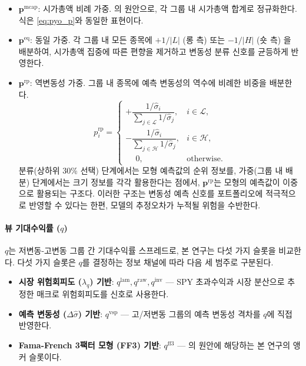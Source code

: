 \documentclass{article}
\begin{document}
\begin{itemize}
  \item $\mathbf{p}^{\mathrm{mcap}}$: 시가총액 비례 가중. \citet{pyo2018}의 원안으로, 각 그룹 내 시가총액 합계로 정규화한다. 식은 \eqref{eq:pyo_p}와 동일한 표현이다.

  \item $\mathbf{p}^{\mathrm{eq}}$: 동일 가중. 각 그룹 내 모든 종목에 $+1/|L|$ (롱 측) 또는 $-1/|H|$ (숏 측) 을 배분하여, 시가총액 집중에 따른 편향을 제거하고 변동성 분류 신호를 균등하게 반영한다.

  \item $\mathbf{p}^{\mathrm{rp}}$: 역변동성 가중. 그룹 내 종목에 예측 변동성의 역수에 비례한 비중을 배분한다.
    \begin{equation}
      p_i^{\mathrm{rp}} =
      \begin{cases}
        +\dfrac{1/\hat{\sigma}_i}{\sum_{j \in \mathcal{L}} 1/\hat{\sigma}_j}, & i \in \mathcal{L}, \\[8pt]
        -\dfrac{1/\hat{\sigma}_i}{\sum_{j \in \mathcal{H}} 1/\hat{\sigma}_j}, & i \in \mathcal{H}, \\[6pt]
        \phantom{+}0, & \text{otherwise}.
      \end{cases}
      \label{eq:p_rp}
    \end{equation}
    분류(상하위 30\% 선택) 단계에서는 모형 예측값의 순위 정보를, 가중(그룹 내 배분) 단계에서는 크기 정보를 각각 활용한다는 점에서, $\mathbf{p}^{\mathrm{rp}}$는 모형의 예측값이 이중으로 활용되는 구조다. 이러한 구조는 변동성 예측 신호를 포트폴리오에 적극적으로 반영할 수 있다는 한편, 모델의 추정오차가 누적될 위험을 수반한다. 
\end{itemize}

\paragraph{뷰 기대수익률 ($q$)}

$q$는 저변동-고변동 그룹 간 기대수익률 스프레드로, 본 연구는 다섯 가지 슬롯을 비교한다. 다섯 가지 슬롯은 $q$를 결정하는 정보 채널에 따라 다음 세 범주로 구분된다.

\begin{itemize}
  \item \textbf{시장 위험회피도 ($\lambda_q$) 기반}: $q^{\mathrm{lam}}, q^{\mathrm{raw}}, q^{\mathrm{inv}}$ --- SPY 초과수익과 시장 분산으로 추정한 매크로 위험회피도를 신호로 사용한다.
  \item \textbf{예측 변동성 ($\Delta\hat{\sigma}$) 기반}: $q^{\mathrm{vsp}}$ --- 고/저변동 그룹의 예측 변동성 격차를 $q$에 직접 반영한다.
  \item \textbf{Fama-French 3팩터 모형 (FF3) 기반}: $q^{\mathrm{ff3}}$ --- \citet{pyo2018}의 원안에 해당하는 본 연구의 앵커 슬롯이다.
\end{itemize}
\end{document}
